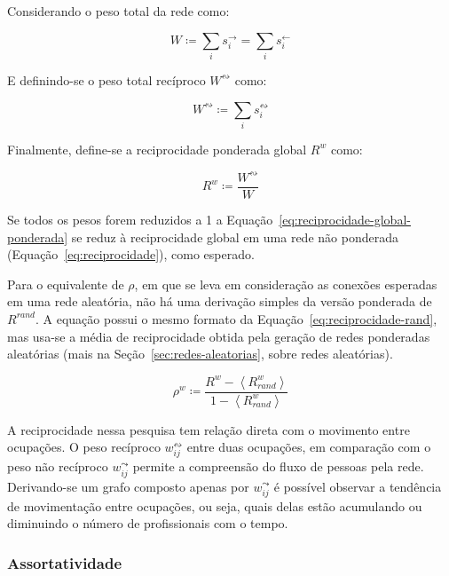 \documentclass[12pt,a4paper]{article}
\theoremstyle{hypo}
\newcommand{\avg}[1]{\left\langle #1 \right\rangle} %
\newcommand{\defn}{\coloneqq} %
\newcommand{\linkin}[1]{#1^\leftarrow} %
\newcommand{\linkout}[1]{#1^\rightarrow} %
\newcommand{\weighted}[1]{#1^w} %
\newcommand{\recout}[1]{#1^\leadsto} %
\newcommand{\recboth}[1]{#1^\leftrightsquigarrow} %
\begin{document}
Considerando o peso total da rede como:

\begin{equation}
W \defn \sum_i \linkout{s}_i = \sum_i \linkin{s}_i
\end{equation}

E definindo-se o peso total recíproco $\recboth{W}$ como:

\begin{equation}
\recboth{W} \defn \sum_i \recboth{s}_i
\end{equation}

Finalmente, define-se a reciprocidade ponderada global $\weighted{R}$ como:

\begin{equation} \label{eq:reciprocidade-global-ponderada}
\weighted{R} \defn \frac{\recboth{W}}{W}
\end{equation}

Se todos os pesos forem reduzidos a 1 a Equação~\ref{eq:reciprocidade-global-ponderada} se reduz à reciprocidade global em uma rede não ponderada (Equação~\ref{eq:reciprocidade}), como esperado.

Para o equivalente de $\rho$, em que se leva em consideração as conexões esperadas em uma rede aleatória, não há uma derivação simples da versão ponderada de $R^\textit{rand}$. A equação possui o mesmo formato da Equação~\ref{eq:reciprocidade-rand}, mas usa-se a média de reciprocidade obtida pela geração de redes ponderadas aleatórias (mais na Seção~\ref{sec:redes-aleatorias}, sobre redes aleatórias).

\begin{equation}
\weighted{\rho} \defn \frac{\weighted{R} - \avg{\weighted{R}_\textit{rand}}}{1 -  \avg{\weighted{R}_\textit{rand}}}
\end{equation}

A reciprocidade nessa pesquisa tem relação direta com o movimento entre ocupações. O peso recíproco $\recboth{w}_{ij}$ entre duas ocupações, em comparação com o peso não recíproco $\recout{w}_{ij}$ permite a compreensão do fluxo de pessoas pela rede. Derivando-se um grafo composto apenas por $\recout{w}_{ij}$ é possível observar a tendência de movimentação entre ocupações, ou seja, quais delas estão acumulando ou diminuindo o número de profissionais com o tempo.

\subsubsection{Assortatividade} \label{sec:assortatividade}
\end{document}
